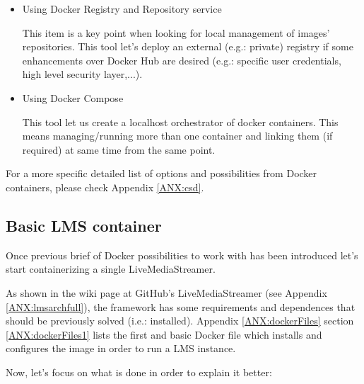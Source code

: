 {\begin{itemize}
\begin{itemize}
	It's a public registry of Docker images' repositories (there are also private ones with specific paying plans) from Docker official site. There is a list of basic (e.g.: CentOS, Ubuntu, Debian, ...) and complex (e.g.: CentOs + Nginx, Ubuntu + Nginx + Wordpress, Debian + Node.js + MongoDB, ...) containers containing clean and/or OS environments. 
	
	\item Using Docker Registry and Repository service

	This item is a key point when looking for local management of images' repositories. This tool let's deploy an external (e.g.: private) registry if some enhancements over Docker Hub are desired (e.g.: specific user credentials, high level security layer,...).
	
	\item Using Docker Compose
	
	This tool let us create a localhost orchestrator of docker containers. This means managing/running more than one container and linking them (if required) at same time from the same point.
	
	\end{itemize}
\end{itemize}}

For a more specific detailed list of options and possibilities from Docker containers, please check Appendix \ref{ANX:csd}.

\subsection{Basic LMS container}

Once previous brief of Docker possibilities to work with has been introduced let's start containerizing a single LiveMediaStreamer.

As shown in the wiki page at GitHub's LiveMediaStreamer (see Appendix \ref{ANX:lmsarchfull}), the framework has some requirements and dependences that should be previously solved (i.e.: installed). Appendix \ref{ANX:dockerFiles} section \ref{ANX:dockerFiles1} lists the first and basic Docker file which installs and configures the image in order to run a LMS instance. 

Now, let's focus on what is done in order to explain it better: 

